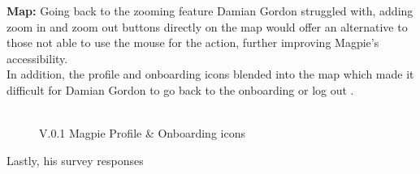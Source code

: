 \textbf{Map: }
Going back to the zooming feature Damian Gordon struggled with, adding zoom in and zoom out buttons directly on the map would offer an alternative to those not able to use the mouse for the action, further improving Magpie's accessibility.\\In addition, the profile and onboarding icons blended into the map which made it difficult for Damian Gordon to go back to the onboarding or log out .\\\\
\begin{figure}
    \centering
    \caption{V.0.1 Magpie Profile \& Onboarding icons}
\end{figure}

Lastly, his survey responses 
